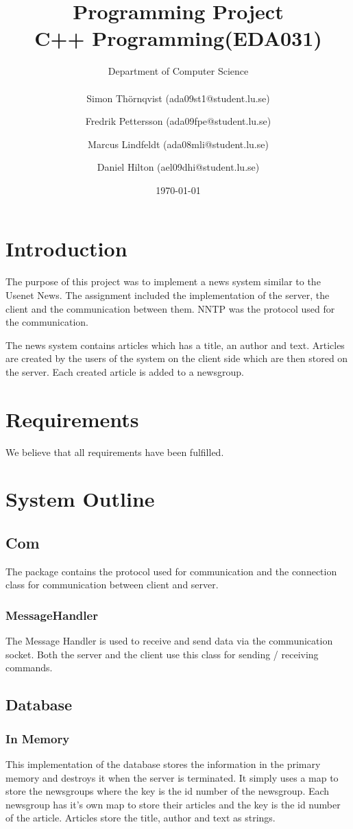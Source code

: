 \documentclass[a4paper, titlepage]{article}
\title{
    Programming Project \\
    C++ Programming(EDA031)
}
\author{
        Department of Computer Science \\
            \\
        Simon Thörnqvist (ada09st1@student.lu.se)
            \and
        Fredrik Pettersson (ada09fpe@student.lu.se)
            \and
        Marcus Lindfeldt (ada08mli@student.lu.se)
            \and
        Daniel Hilton (ael09dhi@student.lu.se)
}
\date{\today}
\begin{document}
\maketitle

\section{Introduction}\label{introduction}
The purpose of this project was to implement a news system similar to the Usenet News. The assignment included the implementation of the server, the client and the communication between them. NNTP was the protocol used for the communication.

The news system contains articles which has a title, an author and text. Articles are created by the users of the system on the client side which are then stored on the server. Each created article is added to a newsgroup.

\section{Requirements}\label{requirements}
We believe that all requirements have been fulfilled.

\section{System Outline}\label{systemoutline}

\subsection{Com}
The package contains the protocol used for communication and the connection class for communication between client and server.

\subsubsection{MessageHandler}
The Message Handler is used to receive and send data via the communication socket. Both the server and the client use this class for sending / receiving commands.

\subsection{Database}

\subsubsection{In Memory}
This implementation of the database stores the information in the primary memory and destroys it when the server is terminated. It simply uses a map to store the newsgroups where the key is the id number of the newsgroup. Each newsgroup has it's own map to store their articles and the key is the id number of the article. Articles store the title, author and text as strings.
\end{document}
